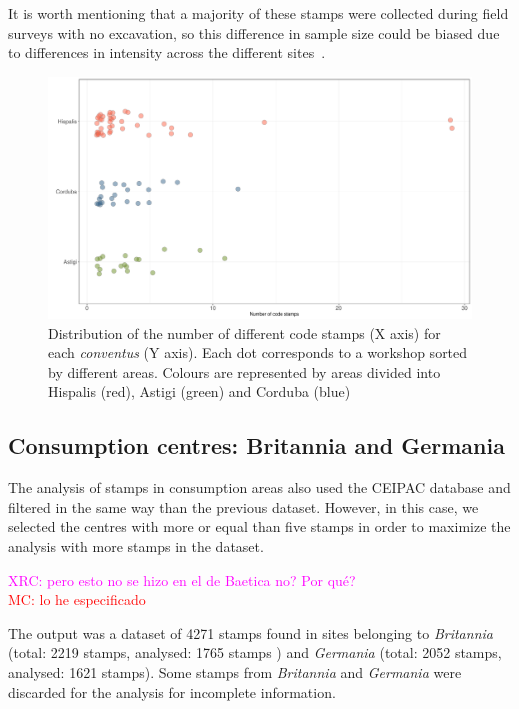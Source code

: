 \documentclass[review]{elsarticle}
\newcommand{\memo}[2]{\textcolor{#1}{#2}}
\newcommand{\maria}[1]{\memo{red}{MC: #1\\}}
\newcommand{\xavi}[1]{\memo{magenta}{XRC: #1\\}}
\begin{document}
It is worth mentioning that a majority of these stamps were collected during field surveys with no excavation, so this difference in sample size could be biased due to differences in intensity across the different sites~\citep{arva_1997}.
 
\begin{figure}[htp]
	\centering
\includegraphics[width=\linewidth]{figs/frequency}
\caption{Distribution of the number of different code stamps (X axis) for each \textit{conventus} (Y axis). Each dot corresponds to a workshop sorted by different areas. Colours are represented by areas divided into Hispalis (red), Astigi (green) and Corduba (blue)}
\label{frequency}
\end{figure} 



\subsection{Consumption centres: Britannia and Germania}


The analysis of stamps in consumption areas also used the CEIPAC database and filtered in the same way than the previous dataset. However, in this case, we selected the centres with more or equal than five stamps in order to maximize the analysis with more stamps in the dataset.   

\xavi{pero esto no se hizo en el de Baetica no? Por qué?}
\maria{lo he especificado}

The output was a dataset of 4271 stamps found in sites belonging to \textit{Britannia} (total: 2219 stamps, analysed: 1765 stamps ) and \textit{Germania} (total: 2052 stamps, analysed: 1621 stamps). Some stamps from \textit{Britannia} and \textit{Germania} were discarded for the analysis for incomplete information.  
\end{document}
